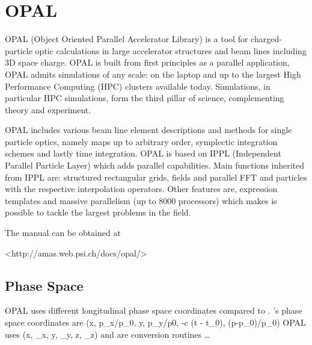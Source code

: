 \chapter{OPAL}
\label{c:opal}

OPAL (Object Oriented Parallel Accelerator Library) is a tool for charged-particle optic calculations in large accelerator structures and beam lines including 3D space charge. OPAL is built from first principles as a parallel application, OPAL admits simulations of any scale: on the laptop and up to the largest High Performance Computing (HPC) clusters available today. Simulations, in particular HPC simulations, form the third pillar of science, complementing theory and experiment.

OPAL includes various beam line element descriptions and methods for single particle optics, namely maps up to arbitrary order, symplectic integration schemes and lastly time integration. OPAL is based on IPPL (Independent Parallel Particle Layer) which adds parallel capabilities. Main functions inherited from IPPL are: structured rectangular grids, fields and parallel FFT and particles with the respective interpolation operators. Other features are, expression templates and massive parallelism (up to 8000 processors) which makes is possible to tackle the largest problems in the field.


The  manual can be obtained at
\begin{example} 
  <http://amas.web.psi.ch/docs/opal/>    
\end{example}


\section{Phase Space}
\label{s:opal.space}

OPAL uses different longitudinal phase space coordinates compared to \bmad.
\bmad's phase space coordinates are
\Begineq
  (x, p_x/p_0, y, p_y/p0, -\beta c (t - t_0), (p-p_0)/p_0)
\Endeq
OPAL uses
\Begineq
  (x, \gamma \beta_x,  y, \gamma \beta_y, z, \gamma \beta_z)
\Endeq
{} and  are conversion routines \ldots


